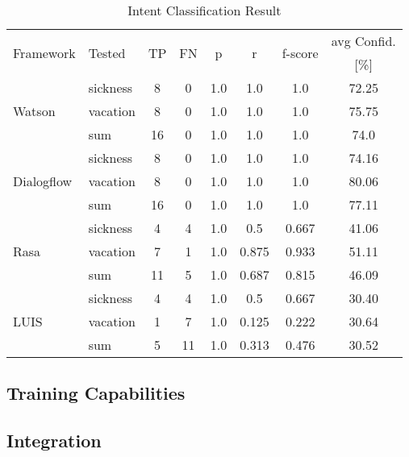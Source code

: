 \begin{table}[h]
    \centering
    \begin{tabular}{ l | l | c | c | c | c | c | c  }
        \multirow{2}{*}{Framework} & \multirow{2}{*}{Tested} & \multirow{2}{*}{TP} & \multirow{2}{*}{FN} & \multirow{2}{*}{p} & \multirow{2}{*}{r} & \multirow{2}{*}{f-score} & avg Confid. \\ 
                 &&          &            &   & & & [\%]     \\ \hline \hline
        \multirow{3}{*}{Watson} 
        & sickness & 8 & 0& 1.0& 1.0& 1.0&72.25 \\
        & vacation & 8 & 0& 1.0& 1.0& 1.0&75.75 \\
        & sum      &16 & 0& 1.0& 1.0& 1.0&74.0  \\ \hline
        
        \multirow{3}{*}{Dialogflow} 
        & sickness & 8& 0& 1.0& 1.0& 1.0&74.16\\
        & vacation & 8& 0& 1.0& 1.0& 1.0&80.06\\
        & sum      &16& 0& 1.0& 1.0& 1.0&77.11\\ \hline

        \multirow{3}{*}{Rasa} 
        & sickness & 4& 4& 1.0& 0.5  & 0.667& 41.06\\
        & vacation & 7& 1& 1.0& 0.875& 0.933& 51.11\\
        & sum      &11& 5& 1.0& 0.687& 0.815& 46.09\\ \hline

        \multirow{3}{*}{LUIS} 
        & sickness & 4& 4& 1.0& 0.5  & 0.667& 30.40\\
        & vacation & 1& 7& 1.0& 0.125& 0.222& 30.64\\
        & sum      & 5&11& 1.0& 0.313& 0.476& 30.52\\
    \end{tabular}
    \caption{Intent Classification Result} \label{tab:intent_classification_result}
\end{table} \noindent


\subsection*{Training Capabilities}
\subsection*{Integration}
